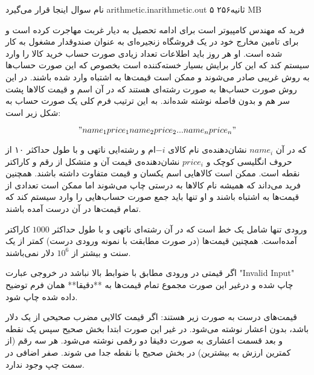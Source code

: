 \gdef\thisproblemauthor{نام صاحب اثر اینجا قرار می‌گیرد}
\gdef\thisproblemdeveloper{نام توسعه‌دهنده اینجا قرار می‌گیرد}
\gdef\thisproblemorigin{\texttt{XXXIII} نام منبع اینجا قرار می‌گیرد}
\begin{problem}{نام سوال اینجا قرار می‌گیرد}
{arithmetic.in}{arithmetic.out}
{۵ ثانیه}{۲۵۶ MB}{}

    فرید که مهندس کامپیوتر است برای ادامه تحصیل به دیار غربت مهاجرت کرده است و برای تامین مخارج خود در یک فروشگاه زنجیره‌ای به عنوان صندوقدار مشغول به کار شده است. او هر روز باید اطلاعات تعداد زیادی صورت حساب‌ خرید کالا را وارد سیستم کند که این کار برایش بسیار خسته‌کننده است بخصوص که این صورت حساب‌ها به روش غریبی صادر می‌شوند و ممکن است قیمت‌ها به اشتباه وارد شده باشند. در این روش صورت‌ حساب‌ها به صورت رشته‌ای هستند که در آن اسم و قیمت کالاها پشت سر هم و بدون فاصله نوشته شده‌‌اند. به این ترتیب فرم کلی یک صورت حساب به شکل زیر است:

    $$"name_1price_1name_2price_2...name_nprice_n"$$

    که در آن $name_i$ نشان‌دهنده‌ی نام کالای ‌$-i$ام و رشته‌ایی ناتهی و با طول حداکثر ۱۰ از حروف انگلیسی کوچک و $price_i$ نشان‌دهنده‌ی قیمت آن و متشکل از رقم و کاراکتر نقطه است.
    ممکن است کالاهایی اسم یکسان و قیمت متفاوت داشته باشند. همچنین فرید می‌داند که همیشه نام کالاها به درستی چاپ می‌شوند اما ممکن است تعدادی از قیمت‌ها به اشتباه باشند و او تنها باید جمع صورت حساب‌هایی را وارد سیستم کند که تمام قیمت‌ها در آن درست آمده باشند.

    \InputFile

    ورودی تنها شامل یک خط است که در آن رشته‌ای ناتهی و با طول حداکثر $1000$ کاراکتر آمده‌است. همچنین قیمت‌ها (در صورت مطابقت با نمونه ورودی درست) کمتر از یک سنت و بیشتر از $10^6$ دلار نمی‌باشند.
    \OutputFile

    اگر قیمتی در ورودی مطابق با ضوابط بالا نباشد در خروجی عبارت "‌Invalid Input" چاپ شده و درغیر این صورت مجموع تمام قیمت‌ها به **دقیقا** همان فرم توضیح داده ‌شده چاپ شود.


    \Examples

    \begin{example}
    \end{example}

    \Explanations

    قیمت‌های درست به صورت زیر هستند:
    اگر قیمت کالایی مضرب صحیحی از یک دلار باشد، بدون اعشار نوشته می‌شود. در غیر این صورت ابتدا بخش صحیح سپس یک نقطه و بعد قسمت اعشاری به صورت دقیقا دو رقمی نوشته می‌شود.
    هر سه رقم (از کمترین ارزش به بیشترین) در بخش صحیح با نقطه جدا می شوند.
    صفر اضافی در سمت چپ وجود ندارد.


\end{problem}
